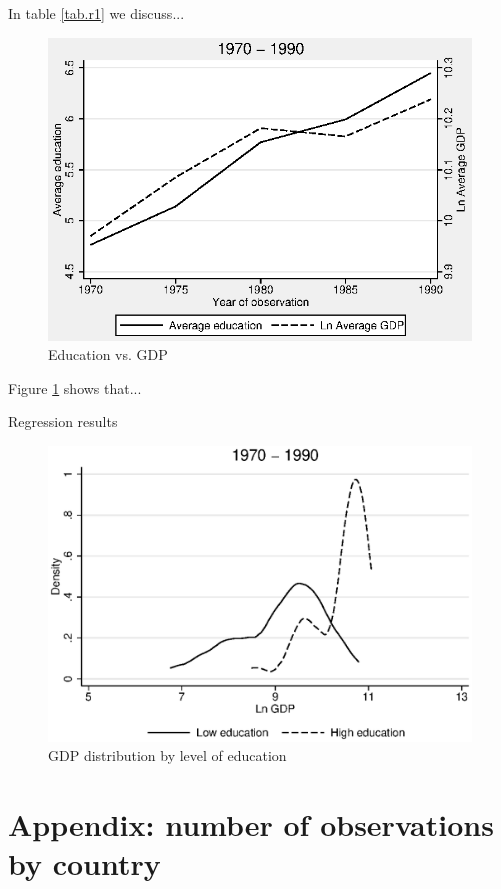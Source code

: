 \documentclass[12pt]{article}
\begin{document}
In table \ref{tab.r1} we discuss...

\lipsum

\begin{figure}[!htb]
\centering
\includegraphics[scale=1.3]{graphs/mean_education_gdp_year.eps}
\caption{Education vs. GDP}
\label{fig:descriptives}
\end{figure}


\lipsum

Figure \ref{fig:descriptives} shows that...

\begin{table}[p]
	\caption{Regression results}
	\label{tab.r2}
			
\end{table}


\lipsum

\begin{figure}[!htb]
\centering
\includegraphics[scale=0.8]{graphs/lngdp_education.eps}
\caption{GDP distribution by level of education}
\label{fig:descriptives2}
\end{figure}

\lipsum

\section*{Appendix: number of observations by country}


\end{document}
